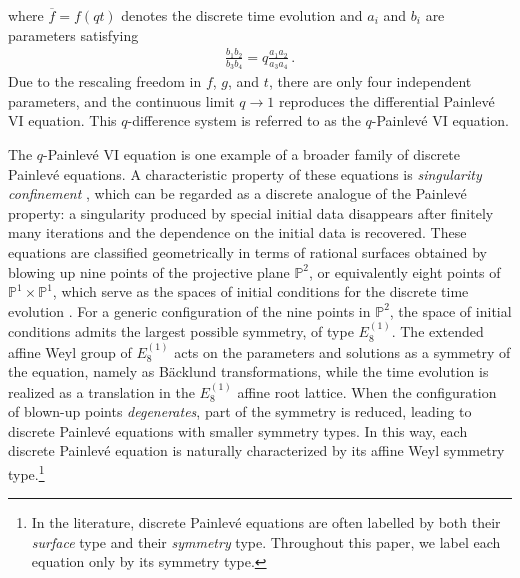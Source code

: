 \documentclass[11pt, a4paper]{article}
\theoremstyle{definition}
\begin{document}
where $ \overline{f}=f(qt) $ denotes the discrete time evolution and $ a_i $ and $ b_i $ are parameters satisfying
\begin{align}
    \frac{b_1b_2}{b_3b_4} = q \frac{a_1a_2}{a_3a_4} \, .
\end{align}
Due to the rescaling freedom in $ f $, $ g $, and $ t $, there are only four independent parameters, and the continuous limit $ q\to 1 $ reproduces the differential Painlev\'e VI equation. This $ q $-difference system is referred to as the $ q $-Painlev\'e VI equation.

The $q$-Painlev\'e VI equation is one example of a broader family of discrete Painlev\'e equations. A characteristic property of these equations is \emph{singularity confinement} \cite{Grammaticos:1991zz}, which can be regarded as a discrete analogue of the Painlev\'e property: a singularity produced by special initial data disappears after finitely many iterations and the dependence on the initial data is recovered. These equations are classified geometrically in terms of rational surfaces obtained by blowing up nine points of the projective plane $ \mathbb{P}^2 $, or equivalently eight points of $ \mathbb{P}^1 \times \mathbb{P}^1 $, which serve as the spaces of initial conditions for the discrete time evolution \cite{Sakai:2001}. For a generic configuration of the nine points in $ \mathbb{P}^2 $, the space of initial conditions admits the largest possible symmetry, of type $ E_8^{(1)} $. The extended affine Weyl group of $ E_8^{(1)} $ acts on the parameters and solutions as a symmetry of the equation, namely as B\"acklund transformations, while the time evolution is realized as a translation in the $ E_8^{(1)} $ affine root lattice. When the configuration of blown-up points \emph{degenerates}, part of the symmetry is reduced, leading to discrete Painlev\'e equations with smaller symmetry types. In this way, each discrete Painlev\'e equation is naturally characterized by its affine Weyl symmetry type.\footnote{In the literature, discrete Painlev\'e equations are often labelled by both their \emph{surface} type and their \emph{symmetry} type. Throughout this paper, we label each equation only by its symmetry type.}
\end{document}
